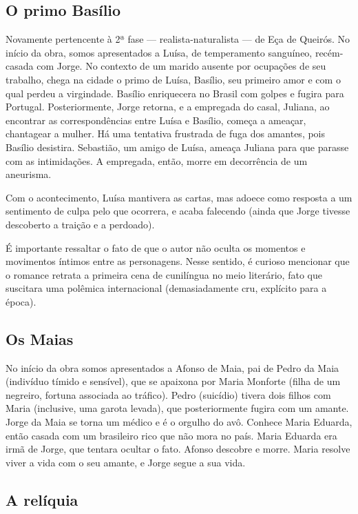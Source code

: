 \subsection{O primo Basílio}

Novamente pertencente à 2ª fase — realista-naturalista — de Eça de Queirós. No início da obra, somos apresentados a Luísa, de temperamento sanguíneo, recém-casada com Jorge. No contexto de um marido ausente por ocupações de seu trabalho, chega na cidade o primo de Luísa, Basílio, seu primeiro amor e com o qual perdeu a virgindade. Basílio enriquecera no Brasil com golpes e fugira para Portugal. Posteriormente, Jorge retorna, e a empregada do casal, Juliana, ao encontrar as correspondências entre Luísa e Basílio, começa a ameaçar, chantagear a mulher. Há uma tentativa frustrada de fuga dos amantes, pois Basílio desistira. Sebastião, um amigo de Luísa, ameaça Juliana para que parasse com as intimidações. A empregada, então, morre em decorrência de um aneurisma.

Com o acontecimento, Luísa mantivera as cartas, mas adoece como resposta a um sentimento de culpa pelo que ocorrera, e acaba falecendo (ainda que Jorge tivesse descoberto a traição e a perdoado).

É importante ressaltar o fato de que o autor não oculta os momentos e movimentos íntimos entre as personagens. Nesse sentido, é curioso mencionar que o romance retrata a primeira cena de cunilíngua no meio literário, fato que suscitara uma polêmica internacional (demasiadamente cru, explícito para a época).

\subsection{Os Maias}

No início da obra somos apresentados a Afonso de Maia, pai de Pedro da Maia (indivíduo tímido e sensível), que se apaixona por Maria Monforte (filha de um negreiro, fortuna associada ao tráfico). Pedro (suicídio) tivera dois filhos com Maria (inclusive, uma garota levada), que posteriormente fugira com um amante. Jorge da Maia se torna um médico e é o orgulho do avô. Conhece Maria Eduarda, então casada com um brasileiro rico que não mora no país. Maria Eduarda era irmã de Jorge, que tentara ocultar o fato. Afonso descobre e morre. Maria resolve viver a vida com o seu amante, e Jorge segue a sua vida.

\subsection{A relíquia}

